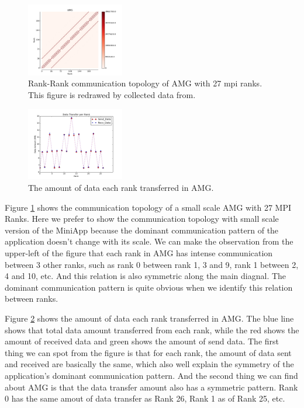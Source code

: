 \documentclass[conference]{IEEEtran}
\begin{document}
\begin{figure}[h!] 
  \centering
  \includegraphics[width=0.38\textwidth]{figs/appstudy/amg/amg_ct}
   \caption{Rank-Rank communication topology of AMG with 27 mpi ranks. This figure is redrawed by collected data from\cite{design forward webpage}.   }
   \label{fig: amg communication topology}
\end{figure}

\begin{figure}[h!] 
  \centering
  \includegraphics[width=0.38\textwidth]{figs/appstudy/amg/amg_data_transfer}
   \caption{The amount of data each rank transferred in AMG. }
   \label{fig: amg data trans}
\end{figure}

Figure \ref{fig: amg communication topology} shows the communication topology of a small scale AMG with 27 MPI Ranks. Here we prefer to show the communication topology with small scale version of the MiniApp because the dominant communication pattern of the application doesn't change with its scale. We can make the observation from the upper-left of the figure that each rank in AMG has intense communication between 3 other ranks, such as rank 0 between rank 1, 3 and 9, rank 1 between 2, 4 and 10, etc. And this relation is also symmetric along the main diagnal. The dominant communication pattern is quite obvious when we identify this relation between ranks.

Figure \ref{fig: amg data trans} shows the amount of data each rank transferred in AMG. The blue line shows that total data amount transferred from each rank, while the red shows the amount of received data and green shows the amount of send data. The first thing we can spot from the figure is that for each rank, the amount of data sent and received are basically the same, which also well explain the symmetry of the application's dominant communication pattern. And the second thing we can find about AMG is that the data transfer amount also has a symmetric pattern. Rank 0 has the same amout of data transfer as Rank 26, Rank 1 as of Rank 25, etc.
\end{document}
